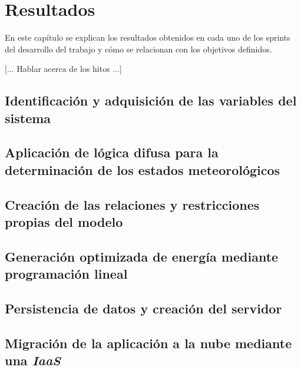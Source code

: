 \chapter{Resultados}
\label{cap:Resultados}
En este capítulo se explican los resultados obtenidos en cada uno de los sprints del desarrollo del trabajo y cómo se relacionan con los objetivos definidos.

[... Hablar acerca de los hitos ...]


\section{Identificación y adquisición de las variables del sistema}

\section{Aplicación de lógica difusa para la determinación de los estados meteorológicos}

\section{Creación de las relaciones y restricciones propias del modelo}

\section{Generación optimizada de energía mediante programación lineal}

\section{Persistencia de datos y creación del servidor}

\section{Migración de la aplicación a la nube mediante una \textit{IaaS}}
